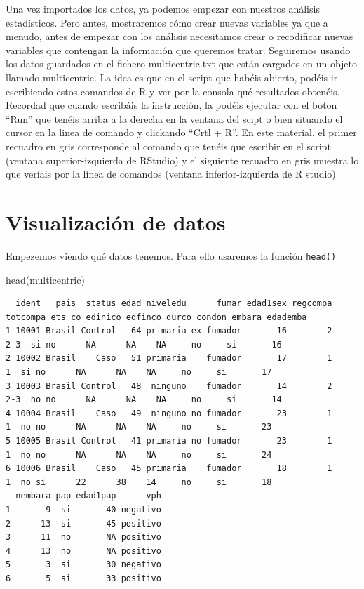 \documentclass[
]{book}
\newenvironment{Shaded}{\begin{snugshade}}{\end{snugshade}}
\newcommand{\FunctionTok}[1]{\textcolor[rgb]{0.00,0.00,0.00}{#1}}
\newcommand{\NormalTok}[1]{#1}
\begin{document}
Una vez importados los datos, ya podemos empezar con nuestros análisis estadísticos. Pero antes, mostraremos cómo crear nuevas variables ya que a menudo, antes de empezar con los análisis necesitamos crear o recodificar nuevas variables que contengan la información que queremos tratar. Seguiremos usando los datos guardados en el fichero multicentric.txt que están cargados en un objeto llamado multicentric. La idea es que en el script que habéis abierto, podéis ir escribiendo estos comandos de R y ver por la consola qué resultados obtenéis. Recordad que cuando escribáis la instrucción, la podéis ejecutar con el boton ``Run'' que tenéis arriba a la derecha en la ventana del scipt o bien situando el cursor en la linea de comando y clickando ``Crtl + R''. En este material, el primer recuadro en gris corresponde al comando que tenéis que escribir en el script (ventana superior-izquierda de RStudio) y el siguiente recuadro en gris muestra lo que veríais por la línea de comandos (ventana inferior-izquierda de R studio)

\hypertarget{visualizaciuxf3n-de-datos}{%
\section{Visualización de datos}\label{visualizaciuxf3n-de-datos}}

Empezemos viendo qué datos tenemos. Para ello usaremos la función \texttt{head()}

\begin{Shaded}
\begin{Highlighting}[]
\FunctionTok{head}\NormalTok{(multicentric)}
\end{Highlighting}
\end{Shaded}

\begin{verbatim}
  ident   pais  status edad niveledu      fumar edad1sex regcompa totcompa ets co edinico edfinco durco condon embara edademba
1 10001 Brasil Control   64 primaria ex-fumador       16        2      2-3  si no      NA      NA    NA     no     si       16
2 10002 Brasil    Caso   51 primaria    fumador       17        1        1  si no      NA      NA    NA     no     si       17
3 10003 Brasil Control   48  ninguno    fumador       14        2      2-3  no no      NA      NA    NA     no     si       14
4 10004 Brasil    Caso   49  ninguno no fumador       23        1        1  no no      NA      NA    NA     no     si       23
5 10005 Brasil Control   41 primaria no fumador       23        1        1  no no      NA      NA    NA     no     si       24
6 10006 Brasil    Caso   45 primaria    fumador       18        1        1  no si      22      38    14     no     si       18
  nembara pap edad1pap      vph
1       9  si       40 negativo
2      13  si       45 positivo
3      11  no       NA positivo
4      13  no       NA positivo
5       3  si       30 negativo
6       5  si       33 positivo
\end{verbatim}
\end{document}
